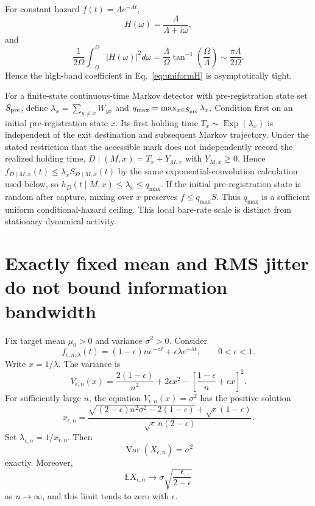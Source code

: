 \documentclass[aps,prapplied,preprint,nofootinbib]{revtex4-2}
\begin{document}
For constant hazard $f(t)=\Lambda e^{-\Lambda t}$,
\begin{equation}
H(\omega)=\frac{\Lambda}{\Lambda+i\omega},
\end{equation}
and
\begin{equation}
\frac{1}{2\Omega}\int_{-\Omega}^{\Omega}|H(\omega)|^2d\omega
=\frac{\Lambda}{\Omega}\tan^{-1}\!\left(\frac{\Omega}{\Lambda}\right)
\sim\frac{\pi\Lambda}{2\Omega}.
\end{equation}
Hence the high-band coefficient in Eq.~\eqref{eq:uniformH} is asymptotically tight.

For a finite-state continuous-time Markov detector with pre-registration state set $S_{\rm pre}$, define $\lambda_x=\sum_{y\ne x}W_{yx}$ and $q_{\max}=\max_{x\in S_{\rm pre}}\lambda_x$. Condition first on an initial pre-registration state $x$. Its first holding time $T_x\sim\operatorname{Exp}(\lambda_x)$ is independent of the exit destination and subsequent Markov trajectory. Under the stated restriction that the accessible mark does not independently record the realized holding time, $D\mid(M,x)=T_x+Y_{M,x}$ with $Y_{M,x}\ge0$. Hence $f_{D\mid M,x}(t)\le\lambda_x S_{D\mid M,x}(t)$ by the same exponential-convolution calculation used below, so $h_D(t\mid M,x)\le\lambda_x\le q_{\max}$. If the initial pre-registration state is random after capture, mixing over $x$ preserves $f\le q_{\max}S$. Thus $q_{\max}$ is a sufficient uniform conditional-hazard ceiling. This local bare-rate scale is distinct from stationary dynamical activity.



\section{Exactly fixed mean and RMS jitter do not bound information bandwidth}

Fix target mean $\mu_0>0$ and variance $\sigma^2>0$. Consider
\begin{equation}
f_{\epsilon,n,\lambda}(t)
=(1-\epsilon)ne^{-nt}
+\epsilon\lambda e^{-\lambda t},
\qquad 0<\epsilon<1.
\end{equation}
Write $x=1/\lambda$. The variance is
\begin{equation}
V_{\epsilon,n}(x)
=\frac{2(1-\epsilon)}{n^2}+2\epsilon x^2
-\left[\frac{1-\epsilon}{n}+\epsilon x\right]^2.
\end{equation}
For sufficiently large $n$, the equation $V_{\epsilon,n}(x)=\sigma^2$ has the positive solution
\begin{equation}
\boxed{
x_{\epsilon,n}
=\frac{
\sqrt{(2-\epsilon)n^2\sigma^2-2(1-\epsilon)}
+\sqrt\epsilon(1-\epsilon)
}{
\sqrt\epsilon\,n(2-\epsilon)
}.}
\label{eq:exactx}
\end{equation}
Set $\lambda_{\epsilon,n}=1/x_{\epsilon,n}$. Then
\begin{equation}
\operatorname{Var}(X_{\epsilon,n})=\sigma^2
\end{equation}
exactly. Moreover,
\begin{equation}
\mathbb E X_{\epsilon,n}\to
\sigma\sqrt{\frac{\epsilon}{2-\epsilon}}
\end{equation}
as $n\to\infty$, and this limit tends to zero with $\epsilon$.
\end{document}
